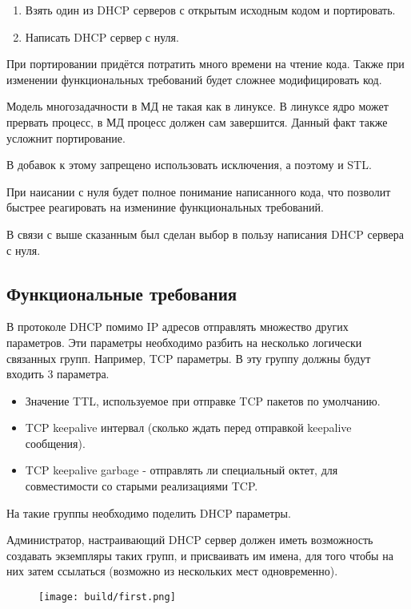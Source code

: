 \documentclass[12pt]{article}
\begin{document}
\begin{enumerate}
    \item Взять один из DHCP серверов с открытым исходным кодом и портировать.
    \item Написать DHCP сервер с нуля.
\end{enumerate}

При портировании придётся потратить много времени на чтение кода.
Также при изменении функциональных требований будет сложнее модифицировать код.

Модель многозадачности в МД не такая как в линуксе.
В линуксе ядро может прервать процесс, в МД процесс должен сам завершится.
Данный факт также усложнит портирование.

В добавок к этому запрещено использовать исключения, а поэтому и STL.

При наисании с нуля будет полное понимание написанного кода, что позволит быстрее реагировать на измениние функциональных требований.

В связи с выше сказанным был сделан выбор в пользу написания DHCP сервера с нуля.

\subsection{Функциональные требования}

В протоколе DHCP помимо IP адресов отправлять множество других параметров.
Эти параметры необходимо разбить на несколько логически связанных групп.
Например, TCP параметры. В эту группу должны будут входить 3 параметра.

\begin{itemize}
    \item Значение TTL, используемое при отправке TCP пакетов по умолчанию.
    \item TCP keepalive интервал (сколько ждать перед отправкой keepalive сообщения).
    \item TCP keepalive garbage - отправлять ли специальный октет, для совместимости со старыми реализациями TCP.
\end{itemize}

На такие группы необходимо поделить DHCP параметры.

Администратор, настраивающий DHCP сервер должен иметь возможность создавать экземпляры таких групп, и присваивать им имена, для того чтобы на них затем ссылаться (возможно из нескольких мест одновременно).

\begin{figure}[H]
    \texttt{[image: build/first.png]}
    \caption{}
\end{figure}
\end{document}
